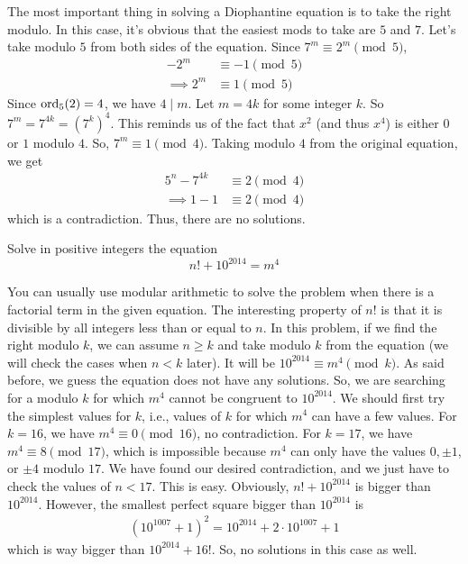 		\begin{solution}
			The most important thing in solving a Diophantine equation is to take the right modulo. In this case, it's obvious that the easiest mods to take are $5$ and $7$. Let's take modulo $5$ from both sides of the equation. Since $7^m \equiv 2^m \pmod 5$,
				\begin{align*}
					-2^m
						& \equiv -1 \pmod 5\\
					\implies 2^m
						& \equiv 1 \pmod 5
				\end{align*}
			Since $\operatorname{ord}_5(2)=4$, we have $4 \mid m$. Let $m=4k$ for some integer $k$. So $7^m = 7^{4k}=\left(7^k\right)^4$. This reminds us of the fact that $x^2$ (and thus $x^4$) is either $0$ or $1$ modulo $4$. So, $7^m \equiv 1 \pmod 4$. Taking modulo $4$ from the original equation, we get
				\begin{align*}
					5^n - 7^{4k}
						& \equiv 2 \pmod 4\\
					\implies 1-1
						& \equiv 2 \pmod 4
				\end{align*}
			which is a contradiction. Thus, there are no solutions.
		\end{solution}

		\begin{problem}[Kazakhstan 2016]
			Solve in positive integers the equation
			\[n!+10^{2014}=m^4\]
		\end{problem}

		\begin{solution}
			You can usually use modular arithmetic to solve the problem when there is a factorial term in the given equation. The interesting property of $n!$ is that it is divisible by all integers less than or equal to $n$. In this problem, if we find the right modulo $k$, we can assume $n\geq k$ and take modulo $k$ from the equation (we will check the cases when $n < k$ later). It will be $10^{2014} \equiv m^4 \pmod k$. As said before, we guess the equation does not have any solutions. So, we are searching for a modulo $k$ for which $m^4$ cannot be congruent to $10^{2014}$. We should first try the simplest values for $k$, i.e., values of $k$ for which $m^4$ can have a few values. For $k=16$, we have $m^4 \equiv 0 \pmod{16}$, no contradiction. For $k=17$, we have $m^4 \equiv 8 \pmod{17}$, which is impossible because $m^4$ can only have the values $0, \pm 1$, or $\pm 4$ modulo $17$. We have found our desired contradiction, and we just have to check the values of $n < 17$. This is easy. Obviously, $n! + 10^{2014}$ is bigger than $10^{2014}$. However, the smallest perfect square bigger than $10^{2014}$ is
				\begin{align*}
					\left(10^{1007}+1\right)^2 = 10^{2014} + 2 \cdot 10^{1007} + 1
				\end{align*}
			which is way bigger than $10^{2014} + 16!$. So, no solutions in this case as well.
		\end{solution}

